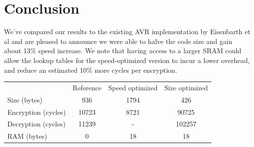 \documentclass{llncs}
\begin{document}
\section{Conclusion}
We've compared our results to the existing AVR implementation by Eisenbarth et al \cite{eisenbarth2012compact} and are pleased to announce we were able to halve the code size and gain about 13\% speed increase.
We note that having access to a larger SRAM could allow the lookup tables for the speed-optimized version to incur a lower overhead, and reduce an estimated 10\% more cycles per encryption. 
\\

	\begin{tabular}{ l | c | c | c }
                & Reference & Speed optimized & Size optimized \\
        Size (bytes) & 936 & 1794 & 426 \\
        Encryption (cycles) & 10723 & 8721 & 90725 \\
        Decryption (cycles) & 11239 & - & 102257 \\
        RAM (bytes) & 0 & 18 & 18
	\end{tabular}

{}

\end{document}
